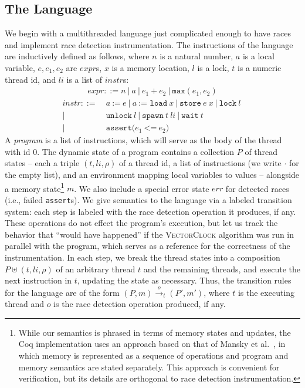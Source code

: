 \documentclass[preprint, 9pt]{sigplanconf}
\newcommand{\VCalg}{\textsc{VectorClock}\xspace}
\newcommand{\assign}[2]{#1\ \texttt{:=}\ #2}
\newcommand{\load}[2]{#1\ \texttt{:= load}\ #2}
\newcommand{\store}[2]{\texttt{store}\ #2\ #1}
\newcommand{\lock}[1]{\texttt{lock}\ #1}
\newcommand{\unlock}[1]{\texttt{unlock}\ #1}
\newcommand{\spawn}[2]{\texttt{spawn}\ #1\ #2}
\newcommand{\wait}[1]{\texttt{wait}\ #1}
\newcommand{\assert}[2]{\texttt{assert(}#1\ \texttt{<=}\ #2\texttt{)}}
\newcommand{\cfg}[2]{\ensuremath{(#1, #2)}}
\newcommand{\anarrow}[2]{\ensuremath{\xrightarrow{#2}_{#1}}}
\newcommand{\exec}[5]{\ensuremath{\cfg{#1}{#2} \anarrow{#3}{#4} #5}}
\begin{document}
\subsection{The Language}
We begin with a multithreaded language just complicated enough to have races and implement race detection instrumentation. The instructions of the language are inductively defined as follows, where $n$ is a natural number, $a$ is a local variable, $e, e_1, e_2$ are $\mathit{expr}$s, $x$ is a memory location, $l$ is a lock, $t$ is a numeric thread id, and $\mathit{li}$ is a list of $\mathit{instr}$s:
\begin{align*}\mathit{expr} ::= n~|~a~|~e_1 + e_2~|~\mathtt{max}(e_1, e_2)\end{align*}
\begin{align*}\mathit{instr} ::=\ &\assign{a}{e}~|~\load{a}{x}~|~\store{x}{e}~|~\lock{l}~\\|~&\unlock{l}~|~\spawn{t}{\mathit{li}}~|~\wait{t}~\\|~&\assert{e_1}{e_2}\end{align*}
A \emph{program} is a list of instructions, which will serve as the body of the thread with id $0$. The dynamic state of a program contains a collection $P$ of thread states -- each a triple $(t, \mathit{li}, \rho)$ of a thread id, a list of instructions (we write $\cdot$ for the empty list), and an environment mapping local variables to values -- alongside a memory state\footnote{While our semantics is phrased in terms of memory states and updates, the Coq implementation uses an approach based on that of Mansky et al.~\cite{memspec}, in which memory is represented as a sequence of operations and program and memory semantics are stated separately. This approach is convenient for verification, but its details are orthogonal to race detection instrumentation.} $m$. We also include a special error state $\mathit{err}$ for detected races (i.e., failed \texttt{assert}s). We give semantics to the language via a labeled transition system: each step is labeled with the race detection operation it produces, if any. These operations do not effect the program's execution, but let us track the behavior that ``would have happened'' if the \VCalg algorithm was run in parallel with the program, which serves as a reference for the correctness of the instrumentation. In each step, we break the thread states into a composition $P \uplus (t, \mathit{li}, \rho)$ of an arbitrary thread $t$ and the remaining threads, and execute the next instruction in $t$, updating the state as necessary. Thus, the transition rules for the language are of the form \exec{P}{m}{t}{o}{(P', m')}, where $t$ is the executing thread and $o$ is the race detection operation produced, if any.
\end{document}
